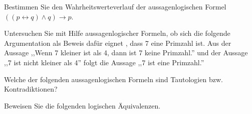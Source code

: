 \documentclass[10pt, a4paper]{exam}
\begin{document}
\begin{questions}

    \question Bestimmen Sie den Wahrheitswerteverlauf der aussagenlogischen Formel $((p \leftrightarrow q) \wedge q) \rightarrow p$.

    \question Untersuchen Sie mit Hilfe aussagenlogischer Formeln, ob sich die folgende Argumentation als Beweis dafür eignet , dass 7 eine Primzahl ist. Aus der Aussage ,,Wenn 7 kleiner ist als 4, dann ist 7 keine Primzahl.'' und der Aussage ,,7 ist nicht kleiner als 4'' folgt die Aussage ,,7 ist eine Primzahl.''

    \question Welche der folgenden aussagenlogischen Formeln sind Tautologien bzw. Kontradiktionen?

    \question Beweisen Sie die folgenden logischen Äquivalenzen.
\end{questions}
\end{document}
